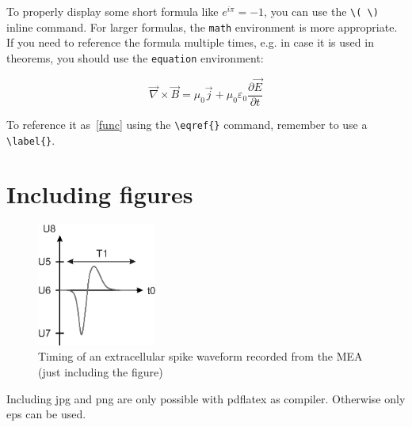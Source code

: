 To properly display some short formula like \( e^{i \pi} = -1\),
you can use the \verb+\( \)+ inline command.
For larger formulas, the \verb+math+ environment is more appropriate.
If you need to reference the formula multiple times,
e.g. in case it is used in theorems,
you should use the \verb+equation+ environment:

\begin{equation}
	\vec\nabla\times\vec{B}= \mu_0\vec{j}+\mu_0\varepsilon_0\frac{\partial\vec{E}}{\partial t}
	\label{func}
\end{equation}

To reference it as~\eqref{func} using the \verb+\eqref{}+ command,
remember to use a \verb+\label{}+.
\section{Including figures}
\begin{figure}[ht]    \centering
    \includegraphics[width=0.35\textwidth]{figures/example.eps}
    \caption[Include figure with short description for table of figures]{Timing of an extracellular spike waveform recorded from the MEA (just including the figure)}
    \label{fig:NeuronSetup0}
\end{figure}
Including jpg and png are only possible with pdflatex as compiler. Otherwise only eps can be used.

\newpage
